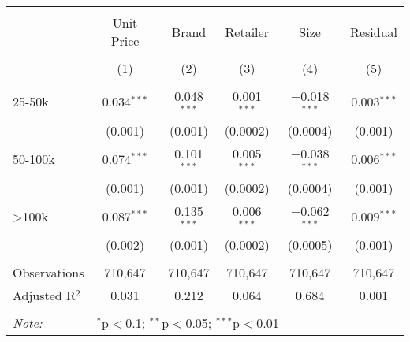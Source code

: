 
\begin{table}[!htbp] \centering 
  \caption{} 
  \label{tab:tpPriceDecomp} 
\begin{tabular}{@{\extracolsep{5pt}}lccccc} 
\\[-1.8ex]\hline 
\hline \\[-1.8ex] 
 & Unit Price & Brand & Retailer & Size & Residual \\ 
\\[-1.8ex] & (1) & (2) & (3) & (4) & (5)\\ 
\hline \\[-1.8ex] 
 25-50k & 0.034$^{***}$ & 0.048$^{***}$ & 0.001$^{***}$ & $-$0.018$^{***}$ & 0.003$^{***}$ \\ 
  & (0.001) & (0.001) & (0.0002) & (0.0004) & (0.001) \\ 
  50-100k & 0.074$^{***}$ & 0.101$^{***}$ & 0.005$^{***}$ & $-$0.038$^{***}$ & 0.006$^{***}$ \\ 
  & (0.001) & (0.001) & (0.0002) & (0.0004) & (0.001) \\ 
  >100k & 0.087$^{***}$ & 0.135$^{***}$ & 0.006$^{***}$ & $-$0.062$^{***}$ & 0.009$^{***}$ \\ 
  & (0.002) & (0.001) & (0.0002) & (0.0005) & (0.001) \\ 
 \hline \\[-1.8ex] 
Observations & 710,647 & 710,647 & 710,647 & 710,647 & 710,647 \\ 
Adjusted R$^{2}$ & 0.031 & 0.212 & 0.064 & 0.684 & 0.001 \\ 
\hline 
\hline \\[-1.8ex] 
\textit{Note:}  & \multicolumn{5}{l}{$^{*}$p$<$0.1; $^{**}$p$<$0.05; $^{***}$p$<$0.01} \\ 
\end{tabular} 
\end{table} 
